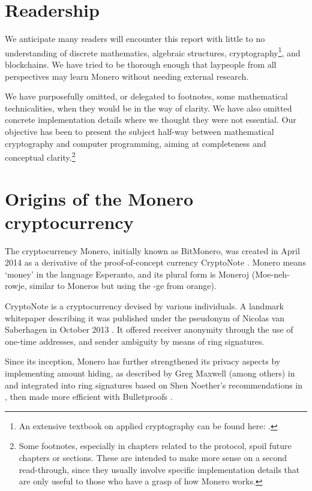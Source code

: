\section{Readership}

We anticipate many readers will encounter this report with little to no understanding of discrete mathematics, algebraic structures, cryptography\footnote{An extensive textbook on applied cryptography can be found here: \cite{applied-cryptography-textbook}.}, and blockchains. We have tried to be thorough enough that laypeople from all perspectives may learn Monero without needing external research.

We have purposefully omitted, or delegated to footnotes, some mathematical technicalities, when they would be in the way of clarity. We have also omitted concrete implementation details where we thought they were not essential. Our objective has been to present the subject half-way between mathematical cryptography and computer programming, aiming at completeness and conceptual clarity.\footnote{Some footnotes, especially in chapters related to the protocol, spoil future chapters or sections. These are intended to make more sense on a second read-through, since they usually involve specific implementation details that are only useful to those who have a grasp of how Monero works.}



\section{Origins of the Monero cryptocurrency}

The cryptocurrency Monero, initially known as BitMonero, was created in April 2014 as a derivative of the proof-of-concept currency CryptoNote \cite{bitmonero-launched}. Monero means `money' in the language Esperanto, and its plural form is Moneroj (Moe-neh-rowje, similar to Moneros but using the -ge from orange).

CryptoNote is a cryptocurrency devised by various individuals. A landmark whitepaper describing it was published under the pseudonym of Nicolas van Saberhagen in October 2013 \cite{cryptoNoteWhitePaper}. It offered receiver anonymity through the use of one-time addresses, and sender ambiguity by means of ring signatures.

Since its inception, Monero has further strengthened its privacy aspects by implementing amount hiding, as described by Greg Maxwell (among others) in \cite{Signatures2015BorromeanRS} and integrated into ring signatures based on Shen Noether's recommendations in \cite{MRL-0005-ringct}, then made more efficient with Bulletproofs \cite{Bulletproofs_paper}.



